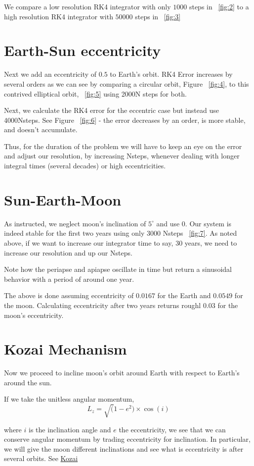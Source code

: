 \documentclass[11pt,letterpaper]{article}
\begin{document}
We compare a low resolution RK4 integrator with only $1000$ steps in ~\ref{fig:2} to a high resolution RK4 integrator with $50000$ steps in ~\ref{fig:3}

\section{Earth-Sun eccentricity}
Next we add an eccentricity of $0.5$ to Earth's orbit. RK4 Error increases by several orders as we can see by comparing a circular orbit, Figure ~\ref{fig:4}, to this contrived elliptical orbit, ~\ref{fig:5} using 2000N steps for both.

Next, we calculate the RK4 error for the eccentric case but instead use 4000Nsteps. See Figure ~\ref{fig:6} - the error decreases by an order, is more stable, and doesn't accumulate.

Thus, for the duration of the problem we will have to keep an eye on the error and adjust our resolution, by increasing Nsteps, whenever dealing with longer integral times (several decades) or high eccentricities.

\section{Sun-Earth-Moon}
As instructed, we neglect moon's inclination of $5^{\circ}$ and use 0.
Our system is indeed stable for the first two years using only 3000 Nsteps ~\ref{fig:7}. As noted above, if we want to increase our integrator time to say, 30 years, we need to increase our resolution and up our Nsteps. 

Note how the periapse and apiapse oscillate in time but return a sinusoidal behavior with a period of around one year.

The above is done assuming eccentricity of $0.0167$ for the Earth and $0.0549$ for the moon. Calculating eccentricity after two years returns roughl $0.03$ for the moon's eccentricity.

\section{Kozai Mechanism}
Now we proceed to incline moon's orbit around Earth with respect to Earth's around the sun. 

If we take the unitless angular momentum,
\begin{equation}
L_z=\sqrt(1-e^2)\times\cos(i)
\end{equation}

where $i$ is the inclination angle and $e$ the eccentricity, we see that we can conserve angular momentum by trading eccentricity for inclination. In particular, we will give the moon different inclinations and see what is eccentricity is after several orbits. See \href{http://adsabs.harvard.edu/cgi-bin/bib_query?1962AJ.....67..591K}{Kozai}
\end{document}
